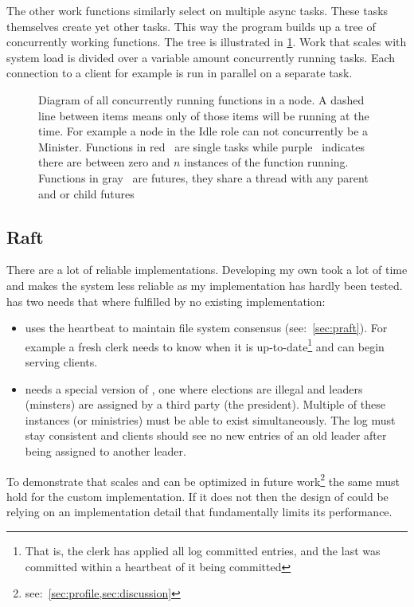 The other work functions similarly select on multiple async tasks. These tasks themselves create yet other tasks. This way the program builds up a tree of concurrently working functions. The tree is illustrated in \cref{fig:tree}. Work that scales with system load is divided over a variable amount concurrently running tasks. Each connection to a client for example is run in parallel on a separate task.
%
\clearpage
\thispagestyle{empty}
\begin{figure}[htbp]
	\centering
	
	\caption{Diagram of all concurrently running functions in a node. A dashed line between items means only of those items will be running at the time. For example a node in the Idle role can not concurrently be a Minister. Functions in red~\taskLeg{} are single tasks while purple~\tasksLeg{} indicates there are between zero and $n$ instances of the function running. Functions in gray~\futureLeg{} are futures, they share a thread with any parent and or child futures}
	\label{fig:tree}
\end{figure}
\clearpage

\subsection{Raft}
There are a lot of reliable \raft{} implementations. Developing my own took a lot of time and makes the system less reliable as my implementation has hardly been tested. \Name{} has two needs that where fulfilled by no existing implementation: 
%
\begin{itemize}
	\item \Name{} uses the \raft{} heartbeat to maintain file system consensus (see:~\cref{sec:praft}). For example a fresh clerk needs to know when it is up-to-date\footnote{That is, the clerk has applied all log committed entries, and the last was committed within a \raft{} heartbeat of it being committed} and can begin serving clients. 
	\item \Name{} needs a special version of \raft{}, one where elections are illegal and leaders (minsters) are assigned by a third party (the president). Multiple of these instances (or ministries) must be able to exist simultaneously. The log must stay consistent and clients should see no new entries of an old leader after being assigned to another leader. 
\end{itemize}
%
To demonstrate that \name{} scales and can be optimized in future work\footnote{see:~\cref{sec:profile,sec:discussion}} the same must hold for the custom implementation. If it does not then the design of \name{} could be relying on an implementation detail that fundamentally limits its performance.
%
